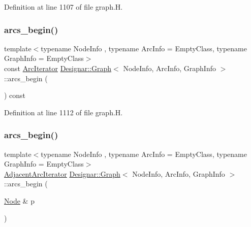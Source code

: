 Definition at line 1107 of file graph.\+H.

\mbox{\label{class_designar_1_1_graph_a3906cae09045bb9c037e1c3c4e64dd97}} 
\subsubsection{\texorpdfstring{arcs\+\_\+begin()}{arcs\_begin()}\hspace{0.1cm}{\footnotesize\ttfamily [2/4]}}
{\footnotesize\ttfamily template$<$typename Node\+Info , typename Arc\+Info  = Empty\+Class, typename Graph\+Info  = Empty\+Class$>$ \\
const \hyperlink{class_designar_1_1_graph_1_1_arc_iterator}{Arc\+Iterator} \hyperlink{class_designar_1_1_graph}{Designar\+::\+Graph}$<$ Node\+Info, Arc\+Info, Graph\+Info $>$\+::arcs\+\_\+begin (\begin{DoxyParamCaption}{ }\end{DoxyParamCaption}) const\hspace{0.3cm}{\ttfamily [inline]}}



Definition at line 1112 of file graph.\+H.

\mbox{\label{class_designar_1_1_graph_a9488f4193d227a690f46e91a11dd830a}} 
\subsubsection{\texorpdfstring{arcs\+\_\+begin()}{arcs\_begin()}\hspace{0.1cm}{\footnotesize\ttfamily [3/4]}}
{\footnotesize\ttfamily template$<$typename Node\+Info , typename Arc\+Info  = Empty\+Class, typename Graph\+Info  = Empty\+Class$>$ \\
\hyperlink{class_designar_1_1_graph_1_1_adjacent_arc_iterator}{Adjacent\+Arc\+Iterator} \hyperlink{class_designar_1_1_graph}{Designar\+::\+Graph}$<$ Node\+Info, Arc\+Info, Graph\+Info $>$\+::arcs\+\_\+begin (\begin{DoxyParamCaption}\item[{\hyperlink{class_designar_1_1_graph_a5dfc7dba9d092ac489c72e40390c37d0}{Node} \&}]{p }\end{DoxyParamCaption})\hspace{0.3cm}{\ttfamily [inline]}}



